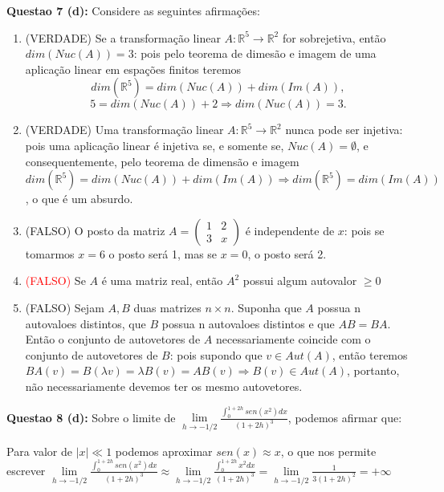 \documentclass{article}
\begin{document}
\textbf{Questao 7 (d):} Considere as seguintes afirmações:
\begin{enumerate}
  \item (VERDADE) Se a transformação linear $A : \mathbb R^5 \to \mathbb R^2$
  for sobrejetiva, então $dim(Nuc(A)) = 3$: pois pelo teorema de
  dimesão e imagem de uma aplicação linear em espações finitos
  teremos 
  $$dim(\mathbb R^5 ) = dim(Nuc(A)) + dim(Im(A)),$$
  $$5 = dim(Nuc(A)) + 2 \Rightarrow dim(Nuc(A)) = 3.$$
  
  \item (VERDADE) Uma transformação linear $A : \mathbb R^5 \to \mathbb R^2$
  nunca pode ser injetiva: pois uma aplicação linear é injetiva se, e somente
  se, $Nuc(A) = \emptyset$, e consequentemente, pelo teorema de
  dimensão e imagem $dim(\mathbb R^5 ) = dim(Nuc(A)) + dim(Im(A)) \Rightarrow
  dim(\mathbb R^5 ) = dim(Im(A))$, o que é um absurdo.
  
  \item (FALSO) O posto da matriz 
$A = 
\left(
\begin{array}{cc}
      1 & 2\\
      3 & x 
\end{array}
\right)
$ é independente de $x$: pois se tomarmos $x=6$ o posto será 1, mas se $x=0$, o
posto será 2.

  \item \textcolor{red}{(FALSO)} Se $A$ é uma matriz real, então $A^2$ possui
  algum autovalor $\geq 0$
  
  \item (FALSO) Sejam $A, B$ duas matrizes $n \times n$. Suponha que $A$ possua
  n autovaloes distintos, que $B$ possua n
  autovaloes distintos e que $AB = BA$. Então o conjunto de autovetores de $A$
  necessariamente coincide com o conjunto de autovetores de $B$: pois supondo
  que $v \in Aut(A)$, então teremos $BA(v)= B(\lambda v) = \lambda B(v) = AB(v)
  \Rightarrow B(v) \in Aut(A)$, portanto, não necessariamente devemos ter os
  mesmo autovetores.

\end{enumerate}



\textbf{Questao 8 (d):} Sobre o limite de $\lim \limits_{h \to -1/2}
\frac{\int_{0}^{1+2h}  sen(x^2) dx}{(1+2h)^3} $, podemos afirmar que:

Para valor de $|x| \ll 1$ podemos aproximar $sen(x) \approx x$, o que nos
permite escrever $\lim \limits_{h \to -1/2}
\frac{\int_{0}^{1+2h}  sen(x^2) dx}{(1+2h)^3} \approx \lim \limits_{h \to -1/2}
\frac{\int_{0}^{1+2h}  x^2 dx}{(1+2h)^3} = \lim \limits_{h \to -1/2}
\frac{1}{3(1+2h)^2} = +\infty$
\end{document}
